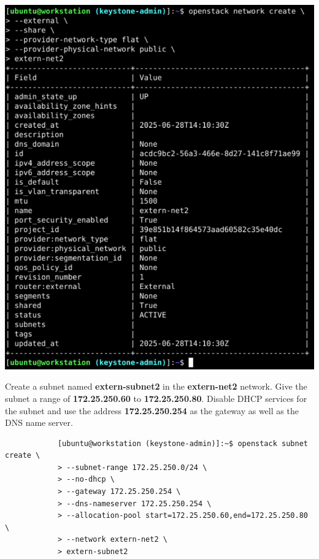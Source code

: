 \documentclass[letterpaper, 12pt]{article}
\begin{document}
\begin{enumerate}
\begin{labstep}
        \begin{center}
            \includegraphics[width=\linewidth]{images/part1/step15.png}
        \end{center}
    \end{labstep}

    \begin{labstep}
        Create a subnet named \textbf{extern-subnet2} in the \textbf{extern-net2} network.
        Give the subnet a range of \textbf{172.25.250.60} to \textbf{172.25.250.80}.
        Disable DHCP services for the subnet and use the address \textbf{172.25.250.254} as the gateway as well as the DNS name server.
        \begin{lstlisting}
            [ubuntu@workstation (keystone-admin)]:~$ openstack subnet create \
            > --subnet-range 172.25.250.0/24 \
            > --no-dhcp \
            > --gateway 172.25.250.254 \
            > --dns-nameserver 172.25.250.254 \
            > --allocation-pool start=172.25.250.60,end=172.25.250.80 \
            > --network extern-net2 \
            > extern-subnet2
        \end{lstlisting}


\end{labstep}
\end{enumerate}
\end{document}
